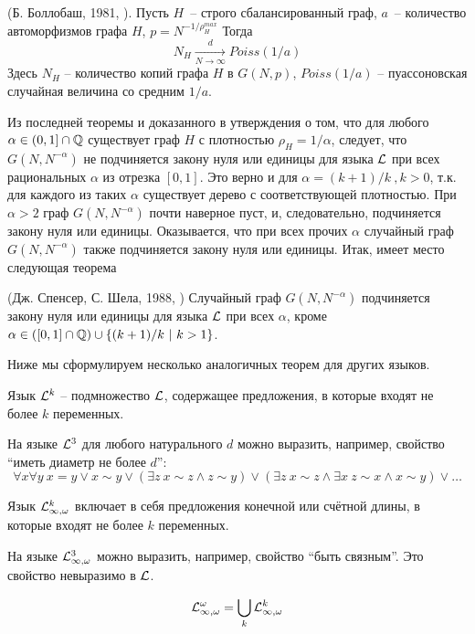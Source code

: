 \begin{theorem} (Б. Боллобаш, 1981, \cite{bollobas1981threshold}). Пусть $H$~-- строго сбалансированный граф, $a$~-- количество автоморфизмов графа $H$, $p = N^{-1/ \rho^{max}_H}$
Тогда
\[N_H \xrightarrow[N\rightarrow \infty]{d} Poiss(1/a) \]
Здесь $N_H$ -- количество копий графа $H$ в $G(N, p)$, $Poiss(1/a)$ -- пуассоновская случайная величина со средним $1/a$.
\end{theorem}
Из последней теоремы и доказанного в \cite{rucinski1986strongly} утверждения о том, что для любого $\alpha \in (0,1] \cap \mathbb {Q}$ существует граф $H$ с плотностью $\rho_H = 1/\alpha$, следует, что $G(N,N^{-\alpha})$ не подчиняется закону нуля или единицы для языка $\mathcal{L}$ при всех рациональных $\alpha$ из отрезка $[0,1]$.
Это верно и для $\alpha = (k+1)/k~, k > 0$, т.к. для каждого из таких $\alpha$ существует дерево с соответствующей плотностью.
При $\alpha > 2$ граф $G(N, N^{-\alpha})$ почти наверное пуст, и, следовательно, подчиняется закону нуля или единицы.
Оказывается, что при всех прочих $\alpha$ случайный граф $G(N, N^{-\alpha})$ также подчиняется закону нуля или единицы.
Итак, имеет место следующая теорема
\begin{theorem} (Дж. Спенсер, С. Шела, 1988, \cite{shelah1988zero})
Случайный граф $G(N, N^{-\alpha})$ подчиняется закону нуля или единицы для языка $\mathcal{L}$ при всех $\alpha$, кроме $\alpha \in \left([0,1] \cap \mathbb {Q} \right) \cup \{(k+1)/k ~|~ k > 1\}$.
\end{theorem}

Ниже мы сформулируем несколько аналогичных теорем для других языков.

\Def Язык $\mathcal{L}^k$ -- подмножество $\mathcal{L}$, содержащее предложения, в которые входят не более $k$ переменных.

На языке $\mathcal{L}^3$ для любого натурального $d$ можно выразить, например, свойство ``иметь диаметр не более $d$'': 
\[
\forall x \forall y ~ x = y \vee x \sim y \vee \left( \exists z ~ x\sim z \wedge z \sim y \right)
\vee  \left( \exists z ~ x\sim z \wedge \exists x ~ z \sim x \wedge x \sim y \right) \vee \ldots
\]

\Def Язык $\mathcal{L}^k_{\infty, \omega}$ включает в себя предложения конечной или счётной длины, в которые входят не более $k$ переменных.

На языке $\mathcal{L}^3_{\infty, \omega}$ можно выразить, например, свойство ``быть связным''.
Это свойство невыразимо в $\mathcal{L}$.

\Def \[\mathcal{L}^\omega_{\infty, \omega} = \bigcup_k \mathcal{L}^k_{\infty, \omega} \]

